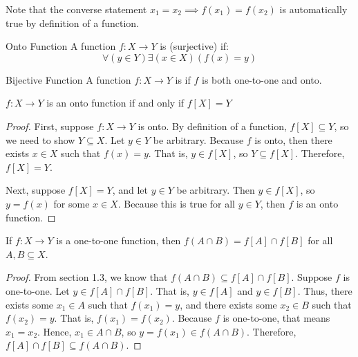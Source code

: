 \documentclass[letterpaper,12pt]{report}
\begin{document}
Note that the converse statement $x_1 = x_2 \implies f(x_1) = f(x_2)$ is automatically true by definition of a function.

\begin{dfnbox}{Onto Function}{}
    A function $f : X \to Y$ is  (surjective) if:
    \[ \forall (y \in Y) \exists (x \in X) (f(x)=y) \]
\end{dfnbox}

\begin{dfnbox}{Bijective Function}{}
    A function $f : X \to Y$ is  if $f$ is both one-to-one and onto.
\end{dfnbox}

\begin{exbox}{}{}
    $f : X \to Y$ is an onto function if and only if $f[X] = Y$
    \tcblower
    \begin{proof}
        First, suppose $f : X \to Y$ is onto. By definition of a function, $f[X] \subseteq Y$, so we need to show $Y \subseteq X$. Let $y \in Y$ be arbitrary. Because $f$ is onto, then there exists $x \in X$ such that $f(x) = y$. That is, $y \in f[X]$, so $Y \subseteq f[X]$. Therefore, $f[X] = Y$.

        Next, suppose $f[X] = Y$, and let $y \in Y$ be arbitrary. Then $y \in f[X]$, so $y = f(x)$ for some $x \in X$. Because this is true for all $y \in Y$, then $f$ is an onto function.
    \end{proof}
\end{exbox}

\begin{exbox}{}{}
    If $f : X \to Y$ is a one-to-one function, then $f(A \cap B) = f[A] \cap f[B]$ for all $A,B \subseteq X$.
    \tcblower
    \begin{proof}
        From section 1.3, we know that $f(A \cap B) \subseteq f[A] \cap f[B]$. Suppose $f$ is one-to-one. Let $y \in f[A] \cap f[B]$. That is, $y \in f[A]$ and $y \in f[B]$. Thus, there exists some $x_1 \in A$ such that $f(x_1) = y$, and there exists some $x_2 \in B$ such that $f(x_2) = y$. That is, $f(x_1) = f(x_2)$. Because $f$ is one-to-one, that means $x_1 = x_2$. Hence, $x_1 \in A \cap B$, so $y = f(x_1) \in f(A \cap B)$. Therefore, $f[A] \cap f[B] \subseteq f(A \cap B)$.
    \end{proof}
\end{exbox}
\end{document}
